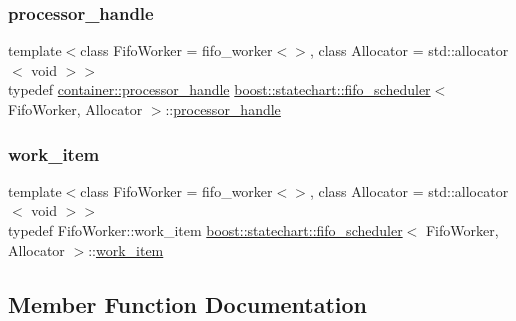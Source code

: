 \subsubsection{\texorpdfstring{processor\+\_\+handle}{processor\_handle}}
{\footnotesize\ttfamily template$<$class Fifo\+Worker = fifo\+\_\+worker$<$$>$, class Allocator = std\+::allocator$<$ void $>$$>$ \\
typedef \mbox{\hyperlink{classboost_1_1statechart_1_1processor__container_a82ebbffaed81d7b99119ae0e892f6411}{container\+::processor\+\_\+handle}} \mbox{\hyperlink{classboost_1_1statechart_1_1fifo__scheduler}{boost\+::statechart\+::fifo\+\_\+scheduler}}$<$ Fifo\+Worker, Allocator $>$\+::\mbox{\hyperlink{classboost_1_1statechart_1_1fifo__scheduler_ada526939c16c4f8118bc4d7bbf09ad7d}{processor\+\_\+handle}}}

\mbox{\label{classboost_1_1statechart_1_1fifo__scheduler_a72ed2c30a2fa295c2e6909ff09754998}} 
\subsubsection{\texorpdfstring{work\+\_\+item}{work\_item}}
{\footnotesize\ttfamily template$<$class Fifo\+Worker = fifo\+\_\+worker$<$$>$, class Allocator = std\+::allocator$<$ void $>$$>$ \\
typedef Fifo\+Worker\+::work\+\_\+item \mbox{\hyperlink{classboost_1_1statechart_1_1fifo__scheduler}{boost\+::statechart\+::fifo\+\_\+scheduler}}$<$ Fifo\+Worker, Allocator $>$\+::\mbox{\hyperlink{classboost_1_1statechart_1_1fifo__scheduler_a72ed2c30a2fa295c2e6909ff09754998}{work\+\_\+item}}}



\subsection{Member Function Documentation}
\mbox{\label{classboost_1_1statechart_1_1fifo__scheduler_a95c23f26708dcf81e6c0f8c4618fc015}} 
